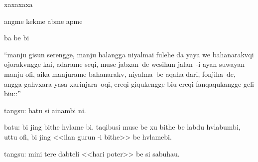 

{\mj \LARGE

xaxaxaxa

angme kekme abme apme

ba be bi

``manju gisun serengge, manju halangga niyalmai fulehe da yaya we bahanarakvqi ojorakvngge kai, adarame seqi, muse jabxan~de wesihun jalan~-i ayan suwayan manju ofi, aika manjurame bahanarakv, niyalma~be aqaha dari, fonjiha~de, angga gahvxara yasa xarinjara~oqi, ereqi giqukengge biu ereqi fanqaqukangge geli biu::''

tangsu: batu si ainambi ni.

batu: bi jing bithe hvlame bi. taqibusi muse be xu bithe be labdu hvlabumbi, uttu ofi, bi jing <<ilan gurun -i bithe>> be hvlamebi.

tangsu: mini tere dabteli <<hari poter>> be si sabuhau.
}

